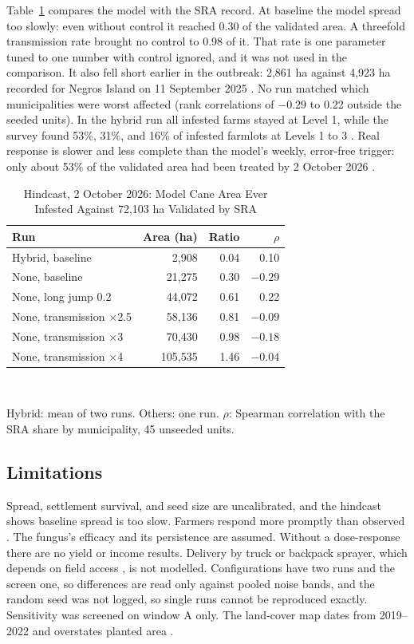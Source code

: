 \documentclass[conference]{IEEEtran}
\begin{document}
Table~\ref{tab:hind} compares the model with the SRA record. At baseline the model spread too slowly: even without control it reached 0.30 of the validated area. A threefold transmission rate brought no control to 0.98 of it. That rate is one parameter tuned to one number with control ignored, and it was not used in the comparison. It also fell short earlier in the outbreak: 2,861 ha against 4,923 ha recorded for Negros Island on 11 September 2025 \cite{MojicaSevilla2025}. No run matched which municipalities were worst affected (rank correlations of $-0.29$ to 0.22 outside the seeded units). In the hybrid run all infested farms stayed at Level 1, while the survey found 53\%, 31\%, and 16\% of infested farmlots at Levels 1 to 3 \cite{PGNO2026}. Real response is slower and less complete than the model's weekly, error-free trigger: only about 53\% of the validated area had been treated by 2 October 2026 \cite{SRA2026FOI}.

\begin{table}[t]
\caption{Hindcast, 2 October 2026: Model Cane Area Ever Infested Against 72,103 ha Validated by SRA}
\label{tab:hind}
\centering
\footnotesize
\begin{tabular}{@{}lrrr@{}}
\toprule
Run & Area (ha) & Ratio & $\rho$ \\
\midrule
Hybrid, baseline & 2,908 & 0.04 & 0.10 \\
None, baseline & 21,275 & 0.30 & $-0.29$ \\
None, long jump 0.2 & 44,072 & 0.61 & 0.22 \\
None, transmission $\times$2.5 & 58,136 & 0.81 & $-0.09$ \\
None, transmission $\times$3 & 70,430 & 0.98 & $-0.18$ \\
None, transmission $\times$4 & 105,535 & 1.46 & $-0.04$ \\
\bottomrule
\end{tabular}
\\[2pt]
\parbox{\columnwidth}{\footnotesize Hybrid: mean of two runs. Others: one run. $\rho$: Spearman correlation with the SRA share by municipality, 45 unseeded units.}
\end{table}

\subsection{Limitations}

Spread, settlement survival, and seed size are uncalibrated, and the hindcast shows baseline spread is too slow. Farmers respond more promptly than observed \cite{SRA2026FOI,PGNO2026}. The fungus's efficacy and its persistence are assumed. Without a dose-response there are no yield or income results. Delivery by truck or backpack sprayer, which depends on field access \cite{PGNO2026}, is not modelled. Configurations have two runs and the screen one, so differences are read only against pooled noise bands, and the random seed was not logged, so single runs cannot be reproduced exactly. Sensitivity was screened on window A only. The land-cover map dates from 2019--2022 and overstates planted area \cite{DiTommaso2024,SRA2026FOI}.
\end{document}
